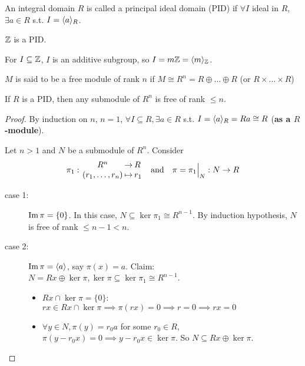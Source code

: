 \begin{definition}
  An integral domain $R$ is called a principal ideal domain (PID)
  if $\forall I$ ideal in $R$, $\exists a \in R$ s.t. $I = \langle a\rangle_R$.
\end{definition}

\begin{example}
  $\mathbb{Z}$ is a PID.

  For $I \subseteq \mathbb{Z}$, $I$ is an additive subgroup, so
  $I = m\mathbb{Z} = \langle m\rangle_{\mathbb{Z}}$.
\end{example}

\begin{definition}
  $M$ is said to be a free module of rank $n$ if
  $M \cong R^n = R \oplus \dots \oplus R$ (or $R \times \dots \times R$)
\end{definition}

\begin{theorem}
  If $R$ is a PID, then any submodule of $R^n$ is free of rank $\le n$.
  \begin{proof}
    By induction on $n$, $n = 1$, $\forall I \subseteq R, \exists a \in R$ s.t.
    $I = \langle a\rangle_R = Ra \cong R$ ({\bf as a $R$-module}).

    Let $n > 1$ and $N$ be a submodule of $R^n$.
    Consider
    \[\arraycolsep=1pt
      \pi_1:
      \begin{array}{ccl}
        R^n & \to & R \\
        (r_1, \dots, r_n) & \mapsto & r_1
      \end{array}
      \quad \text{and} \quad
      \pi = \pi_1\Big|_N: N \to R
    \]
    \begin{description}
      \item[case 1:] $\operatorname{Im} \pi = \{0\}$. In this case,
        $N \subseteq \ker\pi_1 \cong R^{n-1}$.
        By induction hypothesis, $N$ is free of rank $\le n-1 < n$.
      \item[case 2:] $\operatorname{Im} \pi = \langle a\rangle$, say $\pi(x) = a$.
        Claim: $N = Rx \oplus \ker\pi,
        \ker \pi \subseteq \ker \pi_1 \cong R^{n-1}$.
        \begin{itemize}
          \item $Rx \cap \ker\pi = \{0\}$:
            $rx \in Rx \cap \ker\pi \implies \pi(rx) = 0 \implies r = 0
            \implies rx = 0$
          \item $\forall y \in N, \pi(y) = r_0a $ for some $r_0 \in R$,
            $\pi(y - r_0x) = 0 \implies y - r_0x \in \ker\pi$.
            So $N \subseteq Rx \oplus \ker\pi$. \qedhere
        \end{itemize}
    \end{description}
  \end{proof}
\end{theorem}


